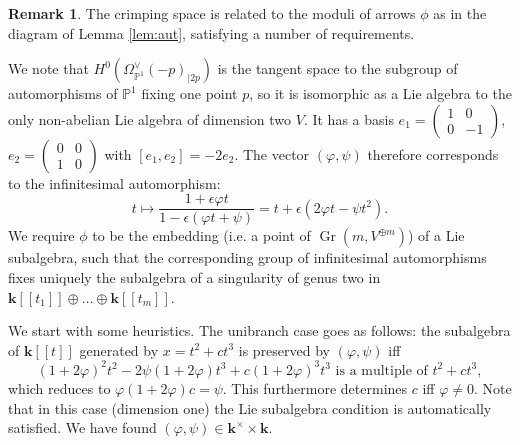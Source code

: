 \documentclass[11pt]{amsart}
\newcommand{\PP}{\mathbb P}
\renewcommand{\k}{\mathbf k}
\theoremstyle{plain}
\theoremstyle{definition}
\newtheorem{rem}[thm]{Remark}
\begin{document}
\begin{rem}
 The crimping space is related to the moduli of arrows $\phi$ as in the diagram of Lemma \ref{lem:aut}, satisfying a number of requirements.
 
 We note that $H^0(\Omega_{\PP^1}^\vee(-p)_{|2p})$ is the tangent space to the subgroup of automorphisms of $\PP^1$ fixing one point $p$, so it is isomorphic as a Lie algebra to the only non-abelian Lie algebra of dimension two $V$. It has a basis $e_1=\begin{pmatrix} 1 & 0 \\ 0 & -1\end{pmatrix}$, $e_2=\begin{pmatrix} 0 & 0 \\ 1 & 0\end{pmatrix}$ with $[e_1,e_2]=-2e_2$. The vector $(\varphi,\psi)$ therefore corresponds to the infinitesimal automorphism: \[t\mapsto\frac{1+\epsilon\varphi t}{1-\epsilon(\varphi t+\psi)}=t+\epsilon(2\varphi t-\psi t^2).\]
 We require $\phi$ to be the embedding (i.e. a point of $\operatorname{Gr}(m,V^{\oplus m})$) of a Lie subalgebra, such that the corresponding group of infinitesimal automorphisms fixes uniquely the subalgebra of a singularity of genus two in $\k[\![t_1]\!]\oplus\ldots\oplus\k[\![t_m]\!]$.
 
 We start with some heuristics. The unibranch case goes as follows: the subalgebra of $\k[\![t]\!]$ generated by $x=t^2+ct^3$ is preserved by $(\varphi,\psi)$ iff
 \[(1+2\varphi)^2t^2-2\psi(1+2\varphi)t^3+c(1+2\varphi)^3t^3\text{ is a multiple of } t^2+ct^3,\]
 which reduces to $\varphi(1+2\varphi)c=\psi$. This furthermore determines $c$ iff $\varphi\neq 0$. Note that in this case (dimension one) the Lie subalgebra condition is automatically satisfied. We have found $(\varphi,\psi)\in\k^\times\times\k$.
 

\end{rem}
\end{document}
